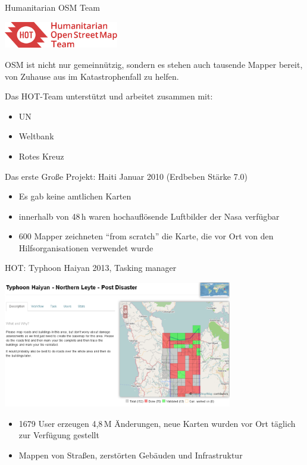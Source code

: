 \documentclass{beamer}
\begin{document}
\begin{frame}{Humanitarian OSM Team}

\vspace{-1.5cm}
\hfill \includegraphics[width=5cm]{hot.png}

OSM ist nicht nur gemeinnützig, sondern es stehen auch tausende Mapper bereit, von Zuhause aus im Katastrophenfall zu helfen.
\vspace{0.1cm}

Das HOT-Team unterstützt und arbeitet zusammen mit:

\begin{itemize}
  \item UN
  \item Weltbank
  \item Rotes Kreuz
\end{itemize}

Das erste Große Projekt: Haiti Januar 2010 (Erdbeben Stärke 7.0)

\begin{itemize}
  \item Es gab keine amtlichen Karten
  \item innerhalb von 48\,h waren hochauflösende Luftbilder der Nasa verfügbar
  \item  600 Mapper zeichneten "`from scratch"' die Karte, die vor Ort von den Hilfsorganisationen verwendet wurde
\end{itemize}

\end{frame}

\begin{frame}{HOT: Typhoon Haiyan 2013, Tasking manager}

\includegraphics[width=10cm]{hot-task.png}

\begin{itemize}
  \item 1679 User erzeugen 4,8\,M Änderungen, neue Karten wurden vor Ort täglich zur Verfügung gestellt
  \item Mappen von Straßen, zerstörten Gebäuden und Infrastruktur
\end{itemize}

\end{frame}
\end{document}
